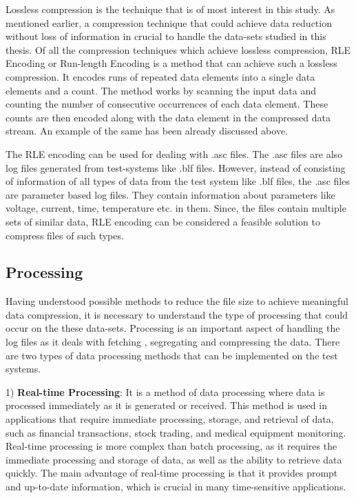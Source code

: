 Lossless compression is the technique that is of most interest in this study. As mentioned earlier, a compression technique that could achieve data reduction without loss of information in crucial to handle the data-sets studied in this thesis. Of all the compression techniques which achieve lossless compression, RLE Encoding or Run-length Encoding is a method that can achieve such a lossless compression. It encodes runs of repeated data elements into a single data elements and a count. The method works by scanning the input data and counting the number of consecutive occurrences of each data element. These counts are then encoded along with the data element in the compressed data stream. An example of the same has been already discussed above.     

The RLE encoding can be used for dealing with .asc files. The .asc files are also log files generated from test-systems like .blf files. However, instead of consisting of information of all types of data from the test system like .blf files, the .asc files are parameter based log files. They contain information about parameters like voltage, current, time, temperature etc. in them. Since, the files contain multiple sets of similar data, RLE encoding can be considered a feasible solution to compress files of such types. 

\newpage

\subsection{Processing}

Having understood possible methods to reduce the file size to achieve meaningful data compression, it is necessary to understand the type of processing that could occur on the these data-sets. Processing is an important aspect of handling the log files as it deals with fetching , segregating and compressing the data. There are two types of data processing methods that can be implemented on the test systems. 

1) \textbf{Real-time Processing}: It is a method of data processing where data is processed immediately as it is generated or received. This method is used in applications that require immediate processing, storage, and retrieval of data, such as financial transactions, stock trading, and medical equipment monitoring. Real-time processing is more complex than batch processing, as it requires the immediate processing and storage of data, as well as the ability to retrieve data quickly. The main advantage of real-time processing is that it provides prompt and up-to-date information, which is crucial in many time-sensitive applications.

